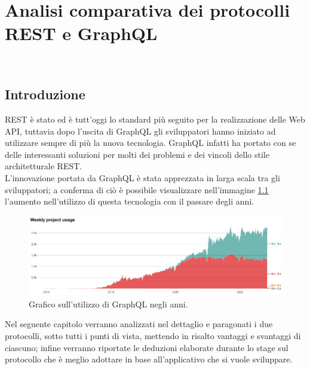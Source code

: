 
\chapter{Analisi comparativa dei protocolli REST e GraphQL}
\label{cap:analisi-comparativa}
\\
\section{Introduzione}
REST è stato ed è tutt'oggi lo standard più seguito per la realizzazione delle Web API, tuttavia dopo l'uscita di GraphQL gli sviluppatori hanno iniziato ad utilizzare sempre di più la nuova tecnologia. GraphQL infatti ha portato con se delle interessanti soluzioni per molti dei problemi e dei vincoli dello stile architetturale REST.\\
L'innovazione portata da GraphQL è stata apprezzata in larga scala tra gli sviluppatori; a conferma di ciò è possibile visualizzare nell'immagine \ref{graphQL-usage-chart} l'aumento nell'utilizzo di questa tecnologia con il passare degli anni.
\FloatBarrier
\begin{figure}[!ht]
\centering
\includegraphics[width=1\linewidth]{immagini/GraphQLUsageChart.png}
\caption{Grafico sull'utilizzo di GraphQL negli anni.}
\label{graphQL-usage-chart}
\end{figure}
\FloatBarrier
Nel seguente capitolo verranno analizzati nel dettaglio e paragonati i due protocolli, sotto tutti i punti di vista, mettendo in risalto vantaggi e svantaggi di ciascuno; infine verranno riportate le deduzioni elaborate durante lo stage sul protocollo che è meglio adottare in base all'applicativo che si vuole sviluppare.
